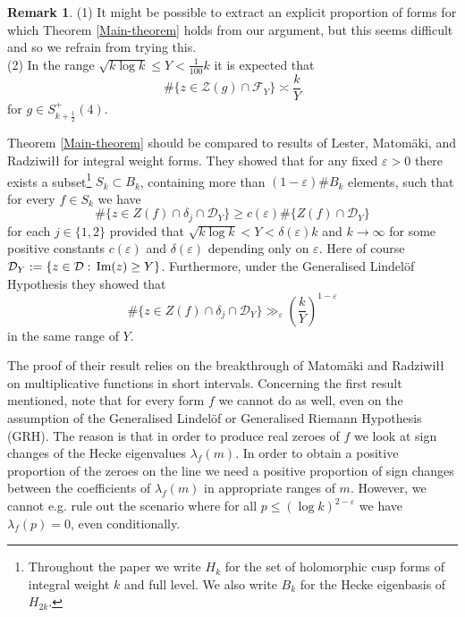 \documentclass[a4paper,10pt,twoside]{amsart}
\theoremstyle{definition}
\newtheorem{rem}[theorem]{Remark}
\numberwithin{equation}{section}
\newcommand\eps{\varepsilon}
\renewcommand{\Im}{\textnormal{Im}}
\renewcommand\:{\colon}
\begin{document}
\begin{rem} (1) It might be possible to extract an explicit proportion of forms for which Theorem \ref{Main-theorem} holds from our argument, but this seems difficult and so we refrain from trying this. \\

\noindent (2) In the range $\sqrt{k\log k}\leq Y<\frac1{100}k$ it is expected that 
\[ 
\#\{z\in\mathcal Z(g)\cap\mathcal F_Y\}\asymp\frac kY
\]
for $g\in S_{k+\frac12}^+(4)$. 
\end{rem}
\noindent Theorem \ref{Main-theorem} should be compared to results of Lester, Matom\"aki, and Radziwi{\l\l} \cite{Lester-Matomaki-Radziwill2018} for integral weight forms. They showed that for any fixed $\eps>0$ there exists a subset\footnote{Throughout the paper we write $H_k$ for the set of holomorphic cusp forms of integral weight $k$ and full level. We also write $B_k$ for the Hecke eigenbasis of $H_{2k}$.} $S_k\subset B_k$, containing more than $(1-\eps)\#B_k$ elements, such that for every $f\in S_k$ we have
\[ 
\#\{z\in Z(f)\cap\delta_j\cap\mathcal D_Y\}\geq c(\eps)\#\{Z(f)\cap \mathcal D_Y\}\]
for each $j\in\{1,2\}$ provided that $\sqrt{k\log k}<Y<\delta(\eps)k$ and $k\longrightarrow\infty$ for some positive constants $c(\eps)$ and $\delta(\eps)$ depending only on $\eps$. Here of course $\mathcal D_Y:=\{z\in\mathcal D:\,\Im(z)\geq Y\}$. Furthermore, under the Generalised Lindel\"of Hypothesis they showed that 
\[ 
\#\{z\in Z(f)\cap\delta_j\cap \mathcal D_Y\}\gg_\eps \left(\frac kY\right)^{1-\eps}
\]
in the same range of $Y$.

The proof of their result relies on the breakthrough of Matom\"aki and Radziwi{\l\l} \cite{Matomaki-Radziwill2016} on multiplicative functions in short intervals. Concerning the first result mentioned, note that for every form $f$ we cannot do as well, even on the assumption of the Generalised Lindel\"of or Generalised Riemann Hypothesis (GRH). The reason is that in order to produce real zeroes of $f$ we look at sign changes of the Hecke eigenvalues $\lambda_f(m)$. In order to obtain a positive proportion of the zeroes on the line we need a positive proportion of sign changes between the coefficients of $\lambda_f(m)$ in appropriate ranges of $m$. However, we cannot e.g. rule out the scenario where for all $p\leq (\log k)^{2-\eps}$ we have $\lambda_f(p)=0$, even conditionally. 
\end{document}
